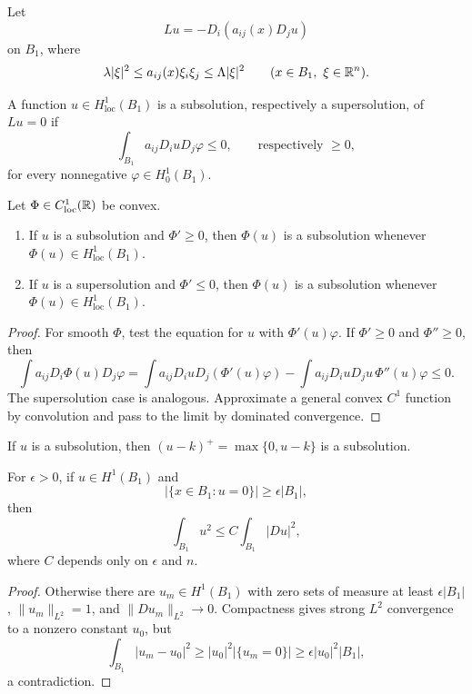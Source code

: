 Let
\[
Lu=-D_i(a_{ij}(x)D_j u)
\]
on $B_1$, where
\[
\lambda|\xi|^2\leq a_{ij}(x)\xi_i\xi_j\leq\Lambda|\xi|^2
\qquad(x\in B_1,\ \xi\in\mathbb{R}^n).
\]

\begin{definition}\label{hanlin:weaksol-part2-homogeneous-subsolution}
A function $u\in H^1_{\mathrm{loc}}(B_1)$ is a subsolution, respectively a
supersolution, of $Lu=0$ if
\[
\int_{B_1}a_{ij}D_i uD_j\varphi\leq0,
\qquad\text{respectively }\geq0,
\]
for every nonnegative $\varphi\in H^1_0(B_1)$.
\end{definition}

\begin{lemma}\label{hanlin:weaksol-part2-convex-composition}
Let $\Phi\in C^1_{\mathrm{loc}}(\mathbb{R})$ be convex.
\begin{enumerate}
\item[(i)] If $u$ is a subsolution and $\Phi'\geq0$, then
$\Phi(u)$ is a subsolution whenever $\Phi(u)\in H^1_{\mathrm{loc}}(B_1)$.
\item[(ii)] If $u$ is a supersolution and $\Phi'\leq0$, then
$\Phi(u)$ is a subsolution whenever $\Phi(u)\in H^1_{\mathrm{loc}}(B_1)$.
\end{enumerate}
\end{lemma}
\begin{proof}
\sketch For smooth $\Phi$, test the equation for $u$ with
$\Phi'(u)\varphi$. If $\Phi'\geq0$ and $\Phi''\geq0$, then
\[
\int a_{ij}D_i\Phi(u)D_j\varphi
=\int a_{ij}D_i uD_j(\Phi'(u)\varphi)
-\int a_{ij}D_i uD_j u\,\Phi''(u)\varphi\leq0.
\]
The supersolution case is analogous. Approximate a general convex $C^1$
function by convolution and pass to the limit by dominated convergence.
\end{proof}

\begin{remark}\label{hanlin:weaksol-part2-positive-part-subsolution}
If $u$ is a subsolution, then $(u-k)^+=\max\{0,u-k\}$ is a subsolution.
\end{remark}

\begin{lemma}\label{hanlin:weaksol-part2-poincare-sobolev-zero-set}
For $\epsilon>0$, if $u\in H^1(B_1)$ and
\[
|\{x\in B_1:u=0\}|\geq\epsilon|B_1|,
\]
then
\[
\int_{B_1}u^2\leq C\int_{B_1}|Du|^2,
\]
where $C$ depends only on $\epsilon$ and $n$.
\end{lemma}
\begin{proof}
\sketch Otherwise there are $u_m\in H^1(B_1)$ with zero sets of measure
at least $\epsilon|B_1|$, $\|u_m\|_{L^2}=1$, and
$\|Du_m\|_{L^2}\to0$. Compactness gives strong $L^2$ convergence to a
nonzero constant $u_0$, but
\[
\int_{B_1}|u_m-u_0|^2
\geq|u_0|^2|\{u_m=0\}|\geq\epsilon|u_0|^2|B_1|,
\]
a contradiction.
\end{proof}

